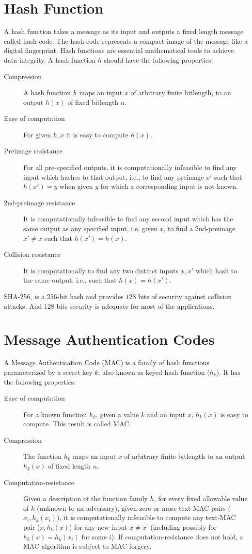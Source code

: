 \section{Hash Function}
	A hash function takes a message as its input and outputs a fixed length message called hash code.
	The hash code represents a compact image of the message like a digital fingerprint.
	Hash functions are essential mathematical tools to achieve data integrity.
	A hash function $h$ should have the following properties:
	\begin{description}
		\item [Compression] A hash function $h$ maps an input $x$ of arbitrary finite bitlength, to an output $h(x)$ of fixed bitlength $n$.
		\item [Ease of computation] For given $h,x$ it is easy to compute $h(x)$.
		\item [Preimage resistance] For all pre-specified outputs, it is computationally infeasible to find any input which hashes to that output, i.e., to find any preimage $x'$ such that $h(x') = y$ when given $y$ for which a corresponding input is not known.
		\item [2nd-preimage resistance] It is computationally infeasible to find any second input which has the same output as any specified input, i.e, given $x$, to find a 2nd-preimage $x' \neq x$ such that $h(x') = h(x)$.
		\item [Collision resistance] It is computationally to find any two distinct inputs $x,x'$ which hash to the same output, i.e., such that $h(x) = h(x')$.
	\end{description} 
	SHA-256, is a 256-bit hash and provides $128$ bits of security against collision attacks\cite{SHA256}.
	And $128$ bits security is adequate for most of the applications.

\section{Message Authentication Codes}
	A Message Authentication Code (MAC) is a family of hash functions parameterized by a secret key $k$, also known as keyed hash function ($h_{k}$).
	It has the following properties:
	\begin{description}
		\item [Ease of computation] For a known function $h_{k}$, given a value $k$
		and an input $x$, $h_{k}(x)$ is easy to compute.
		This result is called MAC.
		\item [Compression] The function $h_{k}$ maps an input $x$ of arbitrary finite bitlength to an output $h_{k}(x)$ of fixed length $n$.  
		\item [Computation-resistance] Given a description of the function family $h$, for every fixed allowable value of $k$ (unknown to an adversary), given zero or more text-MAC pairs ($x_{i}, h_{k}(x_{i})$), it is computationally infeasible to compute any text-MAC pair ($x,h_{k}(x)$) for any new input $x \neq x^{'}$ (including possibly for $h_{k}(x) = h_{k}(x_{i})$ for some $i$). 
	If computation-resistance does not hold, a MAC algorithm is subject to MAC-forgery.
	\end{description}

